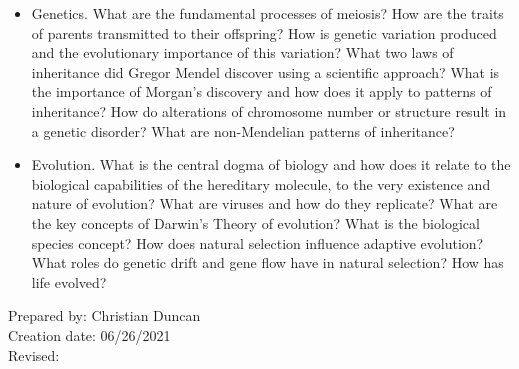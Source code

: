 \begin{enumerate}[1.]
{\begin{itemize}
    \item Genetics.
What are the fundamental processes of meiosis? How are the traits of parents transmitted to their offspring? How is genetic variation produced and the evolutionary importance of this variation? What two laws of inheritance did Gregor Mendel discover using a scientific approach? What is the importance of Morgan’s discovery and how does it apply to patterns of inheritance? How do alterations of chromosome number or structure result in a genetic disorder? What are non-Mendelian patterns of inheritance?

     \item Evolution.
What is the central dogma of biology and how does it relate to the biological capabilities of the hereditary molecule, to the very existence and nature of evolution? What are viruses and how do they replicate? What are the key concepts of Darwin’s Theory of evolution? What is the biological species concept? How does natural selection influence adaptive evolution? What roles do genetic drift and gene flow have in natural selection? How has life evolved?
    \end{itemize}
  }
\end{enumerate}

\noindent Prepared by: Christian Duncan\\
\noindent Creation date: 06/26/2021\\
\noindent Revised:\\
